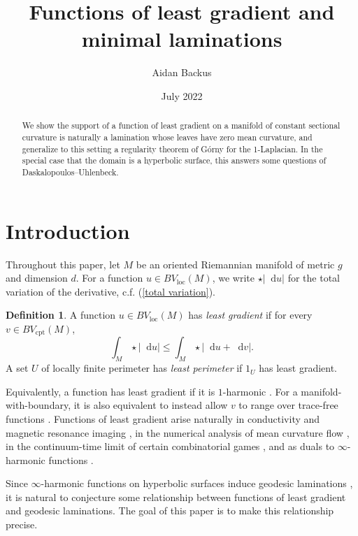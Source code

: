 \documentclass[reqno,10pt]{amsart}
\title{Functions of least gradient and minimal laminations}
\author{Aidan Backus}
\date{July 2022}
\newcommand*\dif{\mathop{}\!\mathrm{d}}
\newcommand{\dfn}[1]{\emph{#1}\index{#1}}
\newcommand{\loc}{\mathrm{loc}}
\newcommand{\cpt}{\mathrm{cpt}}
\theoremstyle{definition}
\newtheorem{definition}[theorem]{Definition}
\numberwithin{equation}{section}
\begin{document}
\begin{abstract}
We show the support of a function of least gradient on a manifold of constant sectional curvature is naturally a lamination whose leaves have zero mean curvature, and generalize to this setting a regularity theorem of G\'orny for the 1-Laplacian.
In the special case that the domain is a hyperbolic surface, this answers some questions of Daskalopoulos--Uhlenbeck.
\end{abstract}

\maketitle



\section{Introduction}
Throughout this paper, let $M$ be an oriented Riemannian manifold of metric $g$ and dimension $d$.
For a function $u \in BV_\loc(M)$, we write $\star |\dif u|$ for the total variation of the derivative, c.f. (\ref{total variation}).

\begin{definition}\label{main definitions}
A function $u \in BV_\loc(M)$ has \dfn{least gradient} if for every $v \in BV_\cpt(M)$,
\begin{equation}\label{least gradient functional}
\int_M \star |\dif u| \leq \int_M \star |\dif u + \dif v|.
\end{equation}
A set $U$ of locally finite perimeter has \dfn{least perimeter} if $1_U$ has least gradient.
\end{definition}

Equivalently, a function has least gradient if it is $1$-harmonic \cite{Mazon14}. For a manifold-with-boundary, it is also equivalent to instead allow $v$ to range over trace-free functions \cite[Theorem 2.2]{Sternberg93}.
Functions of least gradient arise naturally in conductivity and magnetic resonance imaging \cite{Tamasan2019, Joy09}, in the numerical analysis of mean curvature flow \cite{Thomas05}, in the continuum-time limit of certain combinatorial games \cite{Kohn06}, and as duals to $\infty$-harmonic functions \cite{daskalopoulos2020transverse}.

Since $\infty$-harmonic functions on hyperbolic surfaces induce geodesic laminations \cite{daskalopoulos2020transverse}, it is natural to conjecture some relationship between functions of least gradient and geodesic laminations.
The goal of this paper is to make this relationship precise.
\end{document}
